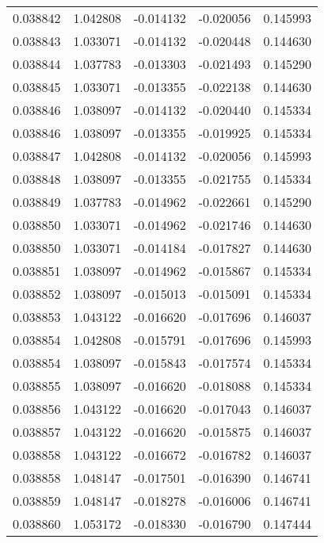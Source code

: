 \begin{tabular}{lrrrr}
0.038842    &  1.042808 & -0.014132 & -0.020056 &             0.145993 \\
0.038843    &  1.033071 & -0.014132 & -0.020448 &             0.144630 \\
0.038844    &  1.037783 & -0.013303 & -0.021493 &             0.145290 \\
0.038845    &  1.033071 & -0.013355 & -0.022138 &             0.144630 \\
0.038846    &  1.038097 & -0.014132 & -0.020440 &             0.145334 \\
0.038846    &  1.038097 & -0.013355 & -0.019925 &             0.145334 \\
0.038847    &  1.042808 & -0.014132 & -0.020056 &             0.145993 \\
0.038848    &  1.038097 & -0.013355 & -0.021755 &             0.145334 \\
0.038849    &  1.037783 & -0.014962 & -0.022661 &             0.145290 \\
0.038850    &  1.033071 & -0.014962 & -0.021746 &             0.144630 \\
0.038850    &  1.033071 & -0.014184 & -0.017827 &             0.144630 \\
0.038851    &  1.038097 & -0.014962 & -0.015867 &             0.145334 \\
0.038852    &  1.038097 & -0.015013 & -0.015091 &             0.145334 \\
0.038853    &  1.043122 & -0.016620 & -0.017696 &             0.146037 \\
0.038854    &  1.042808 & -0.015791 & -0.017696 &             0.145993 \\
0.038854    &  1.038097 & -0.015843 & -0.017574 &             0.145334 \\
0.038855    &  1.038097 & -0.016620 & -0.018088 &             0.145334 \\
0.038856    &  1.043122 & -0.016620 & -0.017043 &             0.146037 \\
0.038857    &  1.043122 & -0.016620 & -0.015875 &             0.146037 \\
0.038858    &  1.043122 & -0.016672 & -0.016782 &             0.146037 \\
0.038858    &  1.048147 & -0.017501 & -0.016390 &             0.146741 \\
0.038859    &  1.048147 & -0.018278 & -0.016006 &             0.146741 \\
0.038860    &  1.053172 & -0.018330 & -0.016790 &             0.147444 \\

\end{tabular}
